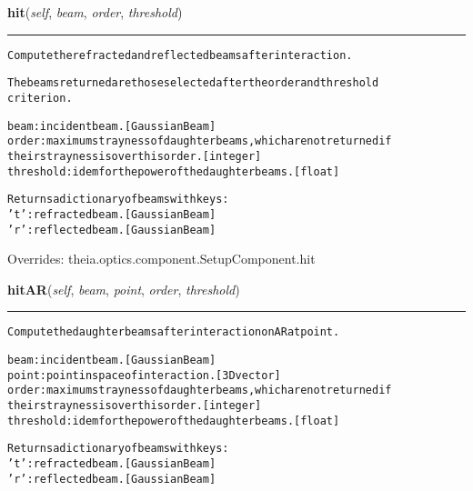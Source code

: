     \vspace{0.5ex}

\hspace{.8\funcindent}\begin{boxedminipage}{\funcwidth}

    \raggedright \textbf{hit}(\textit{self}, \textit{beam}, \textit{order}, \textit{threshold})

    \vspace{-1.5ex}

    \rule{\textwidth}{0.5\fboxrule}
\setlength{\parskip}{2ex}
\begin{alltt}
Compute the refracted and reflected beams after interaction.

The beams returned are those selected after the order and threshold
criterion.

beam: incident beam. [GaussianBeam]
order: maximum strayness of daughter beams, which are not returned if
    their strayness is over this order. [integer]
threshold: idem for the power of the daughter beams. [float]

Returns a dictionary of beams with keys:
    't': refracted beam. [GaussianBeam]
    'r': reflected beam. [GaussianBeam]
\end{alltt}

\setlength{\parskip}{1ex}
      Overrides: theia.optics.component.SetupComponent.hit

    \end{boxedminipage}

    \label{theia:optics:optic:Optic:hitAR}

    \vspace{0.5ex}

\hspace{.8\funcindent}\begin{boxedminipage}{\funcwidth}

    \raggedright \textbf{hitAR}(\textit{self}, \textit{beam}, \textit{point}, \textit{order}, \textit{threshold})

    \vspace{-1.5ex}

    \rule{\textwidth}{0.5\fboxrule}
\setlength{\parskip}{2ex}
\begin{alltt}
Compute the daughter beams after interaction on AR at point.

beam: incident beam. [GaussianBeam]
point: point in space of interaction. [3D vector]
order: maximum strayness of daughter beams, which are not returned if
    their strayness is over this order. [integer]
threshold: idem for the power of the daughter beams. [float]

Returns a dictionary of beams with keys:
    't': refracted beam. [GaussianBeam]
    'r': reflected beam. [GaussianBeam]
\end{alltt}

\setlength{\parskip}{1ex}
    \end{boxedminipage}

